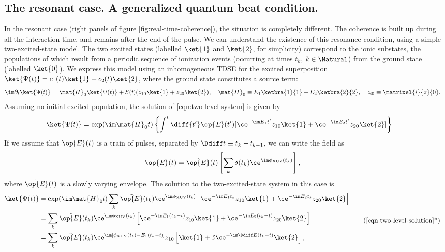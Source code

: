 \subsection{The resonant case. A generalized quantum beat condition.}
\label{sec:orgd61bd89}
In the resonant case (right panels of figure
\ref{fig:real-time-coherence}), the situation is completely
different. The coherence is built up during all the interaction time,
and remains after the end of the pulse. We can understand the
existence of this resonance condition, using a simple
two-excited-state model. The two excited states (labelled \(\ket{1}\)
and \(\ket{2}\), for simplicity) correspond to the ionic substates,
the populations of which result from a periodic sequence of ionization
events (occurring at times \(t_k\), \(k\in\Natural\)) from the ground
state (labelled \(\ket{0}\)). We express this model using an
inhomogeneous TDSE for the excited superposition
\(\ket{\Psi(t)}=c_1(t)\ket{1}+c_2(t)\ket{2}\), where the ground state
constitutes a source term:
\begin{equation}
  \im\partial_t\ket{\Psi(t)} = \mat{H}_0\ket{\Psi(t)} +
  \mathcal{E}(t)(z_{10}\ket{1}+z_{20}\ket{2}),
  \quad
  \mat{H}_0\equiv
  E_1\ketbra{1}{1}+E_2\ketbra{2}{2},
  \quad
  z_{i0}\equiv\matrixel{i}{z}{0}.
  \label{eqn:two-level-system}
\end{equation}
Assuming no initial excited population, the solution of
\eqref{eqn:two-level-system} is given by
\begin{equation}
  \begin{aligned}
    \ket{\Psi(t)}
    &=
    \exp(\im\mat{H}_0t)
    \left\{
      \int^t\diff{t'}
      \op{E}(t')
      [\ce^{-\im E_1t'}z_{10}\ket{1}
      +\ce^{-\im E_2t'}z_{20}\ket{2}]
    \right\}
  \end{aligned}
  \label{eqn:two-level-solution}
\end{equation}
If we assume that \(\op{E}(t)\) is a train of pulses, separated by
\(\Ddiff t\equiv t_k - t_{k-1}\), we can write the field as
\[
  \op{E}(t) =
  \tilde{\op{E}}(t)\left[
    \sum_k\delta(t_k)\ce^{\im\phi_{\textrm{XUV}}(t_k)}
  \right],
\]
where \(\tilde{\op{E}}(t)\) is a slowly varying envelope. The solution
to the two-excited-state system in this case is
\begin{equation}
  \begin{aligned}
    \ket{\Psi(t)}
    &=
    \exp(\im\mat{H}_0t)
    \sum_k
    \tilde{\op{E}}(t_k)
    \ce^{\im\phi_{\textrm{XUV}}(t_k)}
    \left[
      \ce^{-\im E_1t_k}z_{10}\ket{1}
      +\ce^{-\im E_2t_k}z_{20}\ket{2}
    \right]\\
    &=
    \sum_k
    \tilde{\op{E}}(t_k)
    \ce^{\im\phi_{\textrm{XUV}}(t_k)}
    \left[
      \ce^{-\im E_1(t_k-t)}z_{10}\ket{1}
      +\ce^{-\im E_2(t_k-t)}z_{20}\ket{2}
    \right]\\
    &=
    \sum_k
    \tilde{\op{E}}(t_k)
    \ce^{\im[\phi_{\textrm{XUV}}(t_k) - E_1(t_k-t)]}z_{10}
    \left[
      \ket{1}
      +\tilde{z}\ce^{-\im \Ddiff E (t_k-t)}\ket{2}
    \right],
  \end{aligned}
  \label{eqn:two-level-solution-train}
  \tag{\ref{eqn:two-level-solution}*}
\end{equation}
